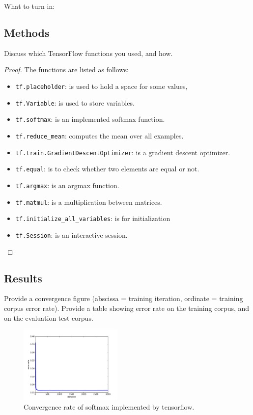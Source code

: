 \documentclass[11pt]{article}
\newcommand{\1}{\mathbf{1}}
\begin{document}
What to turn in:

\subsection{Methods}
Discuss which TensorFlow functions you used, and how.
\begin{proof}
  The functions are listed as follows:
  \begin{itemize}
    \item {\tt tf.placeholder}: is used to hold a space for some values,
    \item {\tt tf.Variable}: is used to store variables.
    \item {\tt tf.softmax}: is an implemented softmax function.
    \item {\tt tf.reduce\_mean}: computes the mean over all examples.
    \item {\tt tf.train.GradientDescentOptimizer}: is a gradient descent optimizer.
    \item {\tt tf.equal}: is to check whether two elements are equal or not.
    \item {\tt tf.argmax}: is an argmax function.
    \item {\tt tf.matmul}: is a multiplication between matrices.
    \item {\tt tf.initialize\_all\_variables}: is for initialization
    \item {\tt tf.Session}: is an interactive session.
  \end{itemize}
\end{proof}

\subsection{Results}

Provide a convergence figure (abscissa = training iteration, ordinate = training corpus error rate). Provide a table showing error rate on the training corpus, and on the evaluation-test corpus.


  \begin{figure}[htbp]
    \begin{center}
      \includegraphics[width=0.45\textwidth]{../figures/tensorflow.pdf}
    \end{center}
    \caption{Convergence rate of softmax implemented by tensorflow.\label{fig:3}}
  \end{figure}
\end{document}
